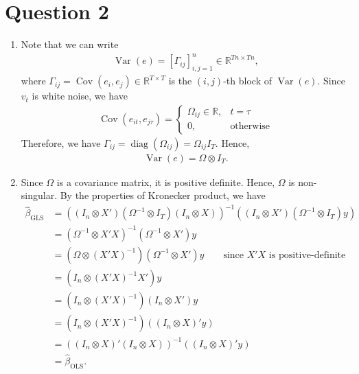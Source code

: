 \documentclass[12pt]{article}
\begin{document}
\section*{Question 2}
\begin{enumerate}[label=\alph*.]
   \item Note that we can write 
   \begin{align*}
    \operatorname{Var}(e) = [\Gamma_{ij}]_{i,j=1}^n \in \mathbb{R}^{Tn \times Tn},
   \end{align*}
   where $\Gamma_{ij} = \operatorname{Cov}(e_i, e_j) \in \mathbb{R}^{T \times T}$ is the $(i, j)$-th block of $\operatorname{Var}(e)$. Since $v_t$ is white noise, we have
   \begin{align*}
    \operatorname{Cov}(e_{it}, e_{j\tau}) = \left\{\begin{array}{ll}
      \Omega_{ij} \in \mathbb{R}, & t=\tau\\
      0, & \text{otherwise}
    \end{array}\right.
   \end{align*}
   Therefore, we have $\Gamma_{ij} = \operatorname{diag}(\Omega_{ij}) = \Omega_{ij}I_T$. Hence,
   \begin{align*}
    \operatorname{Var}(e) = \Omega \otimes I_T.
   \end{align*} 

   \item Since $\Omega$ is a covariance matrix, it is positive definite. Hence, $\Omega$ is non-singular. By the properties of Kronecker product, we have
   \begin{align*}
    \hat{\beta}_{\text{GLS}} &= \left((I_n \otimes X')(\Omega^{-1} \otimes I_T) (I_n \otimes X)\right)^{-1} \left((I_n \otimes X')(\Omega^{-1} \otimes I_T) y \right)\\
    &= (\Omega^{-1} \otimes X'X)^{-1} (\Omega^{-1} \otimes X') y\\
    &= \left(\Omega \otimes (X'X)^{-1}\right)(\Omega^{-1} \otimes X') y \qquad \text{since $X'X$ is positive-definite}\\
    &= \left(I_n \otimes (X'X)^{-1}X'\right) y\\
    &= \left(I_n \otimes (X'X)^{-1}\right) (I_n \otimes X') y\\
    &= \left(I_n \otimes (X'X)^{-1}\right) \left((I_n \otimes X)' y\right)\\
    &= \left((I_n \otimes X)' (I_n \otimes X)\right)^{-1} \left((I_n \otimes X)' y\right)\\
    &= \hat{\beta}_{\text{OLS}}.
   \end{align*}
\end{enumerate}
\end{document}

